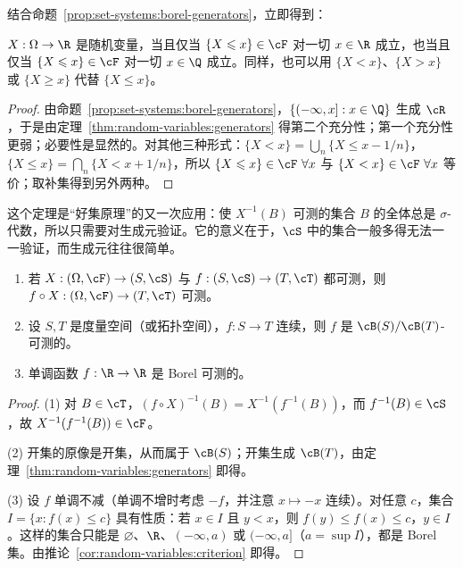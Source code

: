 结合命题~\ref{prop:set-systems:borel-generators}，立即得到：

\begin{corollary}\label{cor:random-variables:criterion}
$X:\Omega\to\R$ 是随机变量，当且仅当 $\{X\leqslant x\}\in\cF$ 对一切 $x\in\R$ 成立，也当且仅当 $\{X\leqslant x\}\in\cF$ 对一切 $x\in\Q$ 成立。同样，也可以用 $\{X<x\}$、$\{X>x\}$ 或 $\{X\geqslant x\}$ 代替 $\{X\leqslant x\}$。
\end{corollary}
\begin{proof}
由命题~\ref{prop:set-systems:borel-generators}，$\{(-\infty,x]:x\in\Q\}$ 生成 $\cR$，于是由定理~\ref{thm:random-variables:generators} 得第二个充分性；第一个充分性更弱；必要性是显然的。对其他三种形式：$\{X<x\}=\bigcup_n\{X\leqslant x-1/n\}$，$\{X\leqslant x\}=\bigcap_n\{X<x+1/n\}$，所以 $\{X\leqslant x\}\in\cF\ \forall x$ 与 $\{X<x\}\in\cF\ \forall x$ 等价；取补集得到另外两种。
\end{proof}

这个定理是“好集原理”的又一次应用：使 $X^{-1}(B)$ 可测的集合 $B$ 的全体总是 $\sigma$-代数，所以只需要对生成元验证。它的意义在于，$\cS$ 中的集合一般多得无法一一验证，而生成元往往很简单。

\begin{theorem}[复合与连续映射]\label{thm:random-variables:composition}
\begin{enumerate}
\item 若 $X:(\Omega,\cF)\to(S,\cS)$ 与 $f:(S,\cS)\to(T,\cT)$ 都可测，则 $f\circ X:(\Omega,\cF)\to(T,\cT)$ 可测。
\item 设 $S,T$ 是度量空间（或拓扑空间），$f:S\to T$ 连续，则 $f$ 是 $\cB(S)/\cB(T)$-可测的。
\item 单调函数 $f:\R\to\R$ 是 Borel 可测的。
\end{enumerate}
\end{theorem}
\begin{proof}
(1) 对 $B\in\cT$，$(f\circ X)^{-1}(B)=X^{-1}(f^{-1}(B))$，而 $f^{-1}(B)\in\cS$，故 $X^{-1}(f^{-1}(B))\in\cF$。

(2) 开集的原像是开集，从而属于 $\cB(S)$；开集生成 $\cB(T)$，由定理~\ref{thm:random-variables:generators} 即得。

(3) 设 $f$ 单调不减（单调不增时考虑 $-f$，并注意 $x\mapsto-x$ 连续）。对任意 $c$，集合 $I=\{x:f(x)\leqslant c\}$ 具有性质：若 $x\in I$ 且 $y<x$，则 $f(y)\leqslant f(x)\leqslant c$，$y\in I$。这样的集合只能是 $\varnothing$、$\R$、$(-\infty,a)$ 或 $(-\infty,a]$（$a=\sup I$），都是 Borel 集。由推论~\ref{cor:random-variables:criterion} 即得。
\end{proof}

